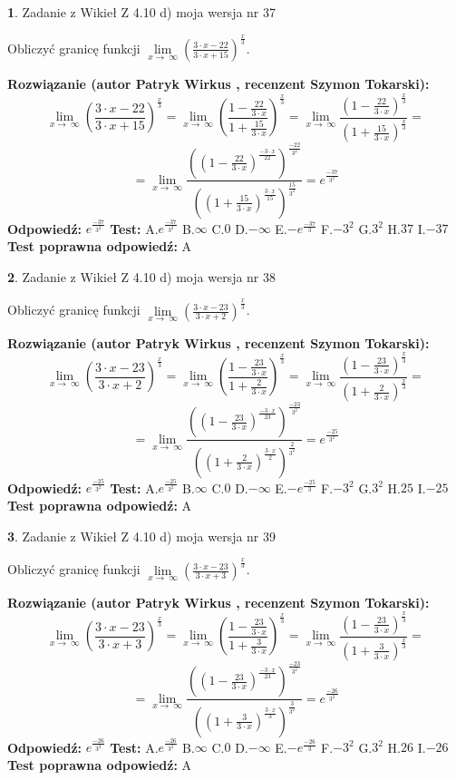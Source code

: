 \documentclass[12pt, a4paper]{article}
\theoremstyle{definition} %
\newtheorem{zad}{}
\newcommand{\zadStart}[1]{\begin{zad}#1\newline}
\newcommand{\zadStop}{\end{zad}}
\newcommand{\rozwStart}[2]{\noindent \textbf{Rozwiązanie (autor #1 , recenzent #2): }\newline}
\newcommand{\rozwStop}{\newline}
\newcommand{\odpStart}{\noindent \textbf{Odpowiedź:}\newline}
\newcommand{\odpStop}{\newline}
\newcommand{\testStart}{\noindent \textbf{Test:}\newline}
\newcommand{\testStop}{\newline}
\newcommand{\kluczStart}{\noindent \textbf{Test poprawna odpowiedź:}\newline}
\newcommand{\kluczStop}{\newline}
\begin{document}
\zadStart{Zadanie z Wikieł Z 4.10 d) moja wersja nr 37}


Obliczyć granicę funkcji  $\lim\limits_{x\to\ \infty}(\frac{3\cdot x-22}{3\cdot x+15})^{\frac{x}{3}}$.
\zadStop
\rozwStart{Patryk Wirkus}{Szymon Tokarski}
$$\lim\limits_{x\to\ \infty}(\frac{3\cdot x-22}{3\cdot x+15})^{\frac{x}{3}} = \lim\limits_{x\to\ \infty}(\frac{1-\frac{22}{3\cdot x}}{1+\frac{15}{3\cdot x}})^{\frac{x}{3}}=\lim\limits_{x\to\ \infty}\frac{(1-\frac{22}{3\cdot x})^{\frac{x}{3}}}{(1+\frac{15}{3\cdot x})^{\frac{x}{3}}}=$$
$$=\lim\limits_{x\to\ \infty}\frac{((1-\frac{22}{3\cdot x})^{\frac{-3\cdot x}{22}})^{\frac{-22}{3^{2}}}}{((1+\frac{15}{3\cdot x})^{\frac{3\cdot x}{15}})^{\frac{15}{3^{2}}}}=e^{\frac{-37}{3^{2}}}$$
\rozwStop
\odpStart
$e^{\frac{-37}{3^{2}}}$
\odpStop
\testStart
A.$e^{\frac{-37}{3^{2}}}$ B.$\infty$ C.$0$ D.$-\infty$ E.$-e^{\frac{-37}{3}}$
F.$-3^{2}$ G.$3^{2}$
H.$37$
I.$-37$
\testStop
\kluczStart
A
\kluczStop



\zadStart{Zadanie z Wikieł Z 4.10 d) moja wersja nr 38}


Obliczyć granicę funkcji  $\lim\limits_{x\to\ \infty}(\frac{3\cdot x-23}{3\cdot x+2})^{\frac{x}{3}}$.
\zadStop
\rozwStart{Patryk Wirkus}{Szymon Tokarski}
$$\lim\limits_{x\to\ \infty}(\frac{3\cdot x-23}{3\cdot x+2})^{\frac{x}{3}} = \lim\limits_{x\to\ \infty}(\frac{1-\frac{23}{3\cdot x}}{1+\frac{2}{3\cdot x}})^{\frac{x}{3}}=\lim\limits_{x\to\ \infty}\frac{(1-\frac{23}{3\cdot x})^{\frac{x}{3}}}{(1+\frac{2}{3\cdot x})^{\frac{x}{3}}}=$$
$$=\lim\limits_{x\to\ \infty}\frac{((1-\frac{23}{3\cdot x})^{\frac{-3\cdot x}{23}})^{\frac{-23}{3^{2}}}}{((1+\frac{2}{3\cdot x})^{\frac{3\cdot x}{2}})^{\frac{2}{3^{2}}}}=e^{\frac{-25}{3^{2}}}$$
\rozwStop
\odpStart
$e^{\frac{-25}{3^{2}}}$
\odpStop
\testStart
A.$e^{\frac{-25}{3^{2}}}$ B.$\infty$ C.$0$ D.$-\infty$ E.$-e^{\frac{-25}{3}}$
F.$-3^{2}$ G.$3^{2}$
H.$25$
I.$-25$
\testStop
\kluczStart
A
\kluczStop



\zadStart{Zadanie z Wikieł Z 4.10 d) moja wersja nr 39}


Obliczyć granicę funkcji  $\lim\limits_{x\to\ \infty}(\frac{3\cdot x-23}{3\cdot x+3})^{\frac{x}{3}}$.
\zadStop
\rozwStart{Patryk Wirkus}{Szymon Tokarski}
$$\lim\limits_{x\to\ \infty}(\frac{3\cdot x-23}{3\cdot x+3})^{\frac{x}{3}} = \lim\limits_{x\to\ \infty}(\frac{1-\frac{23}{3\cdot x}}{1+\frac{3}{3\cdot x}})^{\frac{x}{3}}=\lim\limits_{x\to\ \infty}\frac{(1-\frac{23}{3\cdot x})^{\frac{x}{3}}}{(1+\frac{3}{3\cdot x})^{\frac{x}{3}}}=$$
$$=\lim\limits_{x\to\ \infty}\frac{((1-\frac{23}{3\cdot x})^{\frac{-3\cdot x}{23}})^{\frac{-23}{3^{2}}}}{((1+\frac{3}{3\cdot x})^{\frac{3\cdot x}{3}})^{\frac{3}{3^{2}}}}=e^{\frac{-26}{3^{2}}}$$
\rozwStop
\odpStart
$e^{\frac{-26}{3^{2}}}$
\odpStop
\testStart
A.$e^{\frac{-26}{3^{2}}}$ B.$\infty$ C.$0$ D.$-\infty$ E.$-e^{\frac{-26}{3}}$
F.$-3^{2}$ G.$3^{2}$
H.$26$
I.$-26$
\testStop
\kluczStart
A
\kluczStop
\end{document}
